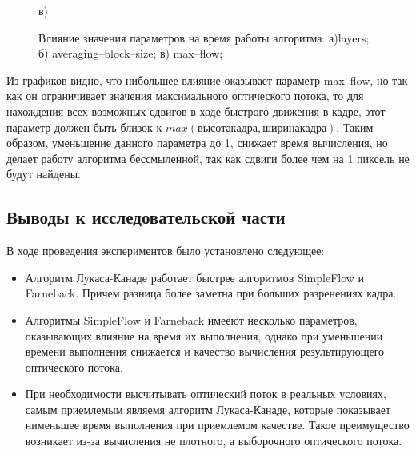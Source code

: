 \begin{figure}[!Htb]
\begin{center}
\begin{minipage}[h]{0.47\linewidth}
	 в) \\
	\end{minipage}
\end{center}
\caption{Влияние значения параметров на время работы алгоритма: а)layers; б)  averaging--block--size; в) max--flow;}
\label{pic:3SF_params}
\end{figure}

Из графиков видно, что нибольшее влияние оказывает параметр max--flow, но так как он ограничивает значения максимального оптического потока, то для нахождения всех возможных сдвигов в ходе быстрого движения в кадре, этот параметр должен быть близок к  $max (высота кадра, ширина кадра) $. Таким образом, уменьшение данного параметра до 1, снижает время вычисления, но делает работу алгоритма бессмыленной, так как сдвиги более чем на 1 пиксель не будут найдены.  


\subsection{Выводы к исследовательской части}
В ходе проведения экспериментов было установлено следующее:
\begin{itemize}
\item Алгоритм Лукаса-Канаде работает быстрее алгоритмов SimpleFlow и Farneback. Причем разница более заметна при больших разренениях кадра. 
\item Алгоритмы SimpleFlow и Farneback имееют несколько параметров, оказывающих влияние на время их выполнения, однако при уменьшении времени выполнения снижается и качество вычисления результирующего оптического потока. 
\item При необходимости высчитывать оптический поток в реальных условиях, самым приемлемым являемя алгоритм Лукаса-Канаде, которые показывает нименьшее время выполнения при приемлемом качестве. Такое преимущество возникает из-за вычисления не плотного, а выборочного оптического потока. 
\end{itemize}